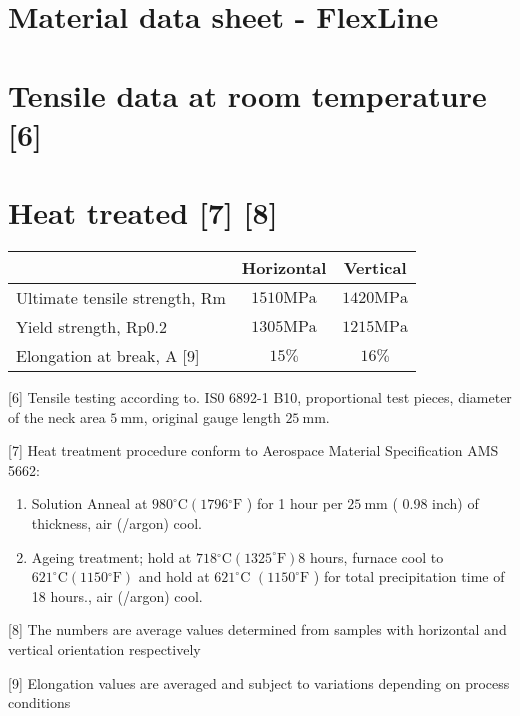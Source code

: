 \documentclass[10pt]{article}
\begin{document}
\section*{Material data sheet - FlexLine}
\section*{Tensile data at room temperature [6]}
\section*{Heat treated [7] [8]}
\begin{center}
\begin{tabular}{lcc}
\hline
 & Horizontal & Vertical \\
\hline
Ultimate tensile strength, Rm & $1510 \mathrm{MPa}$ & $1420 \mathrm{MPa}$ \\
\hline
Yield strength, Rp0.2 & $1305 \mathrm{MPa}$ & $1215 \mathrm{MPa}$ \\
\hline
Elongation at break, A [9] & $15 \%$ & $16 \%$ \\
\hline
\end{tabular}
\end{center}

[6] Tensile testing according to. IS0 6892-1 B10, proportional test pieces, diameter of the neck area $5 \mathrm{~mm}$, original gauge length $25 \mathrm{~mm}$.

[7] Heat treatment procedure conform to Aerospace Material Specification AMS 5662:

\begin{enumerate}
  \item Solution Anneal at $980^{\circ} \mathrm{C}\left(1796{ }^{\circ} \mathrm{F}\right.$ ) for 1 hour per $25 \mathrm{~mm}$ ( 0.98 inch) of thickness, air (/argon) cool.

  \item Ageing treatment; hold at $718{ }^{\circ} \mathrm{C}\left(1325^{\circ} \mathrm{F}\right) 8$ hours, furnace cool to $621^{\circ} \mathrm{C}\left(1150{ }^{\circ} \mathrm{F}\right)$ and hold at $621^{\circ} \mathrm{C}$ $\left(1150^{\circ} \mathrm{F}\right.$ ) for total precipitation time of 18 hours., air (/argon) cool.

\end{enumerate}

[8] The numbers are average values determined from samples with horizontal and vertical orientation respectively

[9] Elongation values are averaged and subject to variations depending on process conditions
\end{document}
